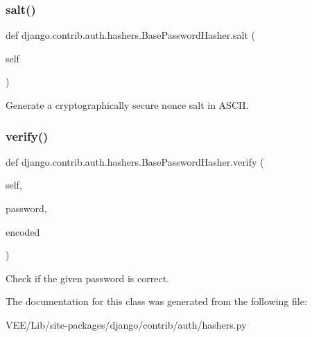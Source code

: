 \subsubsection{\texorpdfstring{salt()}{salt()}}
{\footnotesize\ttfamily def django.\+contrib.\+auth.\+hashers.\+Base\+Password\+Hasher.\+salt (\begin{DoxyParamCaption}\item[{}]{self }\end{DoxyParamCaption})}

\begin{DoxyVerb}Generate a cryptographically secure nonce salt in ASCII.\end{DoxyVerb}
 \mbox{\label{classdjango_1_1contrib_1_1auth_1_1hashers_1_1_base_password_hasher_a6edb32933f71ee82ef20a996c95a5a6f}} 
\subsubsection{\texorpdfstring{verify()}{verify()}}
{\footnotesize\ttfamily def django.\+contrib.\+auth.\+hashers.\+Base\+Password\+Hasher.\+verify (\begin{DoxyParamCaption}\item[{}]{self,  }\item[{}]{password,  }\item[{}]{encoded }\end{DoxyParamCaption})}

\begin{DoxyVerb}Check if the given password is correct.\end{DoxyVerb}
 

The documentation for this class was generated from the following file\+:\begin{DoxyCompactItemize}
\item 
V\+E\+E/\+Lib/site-\/packages/django/contrib/auth/hashers.\+py\end{DoxyCompactItemize}
